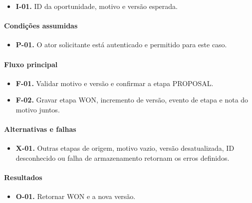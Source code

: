 \documentclass[10pt,a4paper]{article}
\begin{document}
\begin{itemize}

\item \textbf{I-01.} ID da oportunidade, motivo e versão esperada.

\end{itemize}

\paragraph{Condições assumidas}

\begin{itemize}

\item \textbf{P-01.} O ator solicitante está autenticado e permitido para este caso.

\end{itemize}

\paragraph{Fluxo principal}

\begin{itemize}

\item \textbf{F-01.} Validar motivo e versão e confirmar a etapa PROPOSAL.

\item \textbf{F-02.} Gravar etapa WON, incremento de versão, evento de etapa e nota do motivo juntos.

\end{itemize}

\paragraph{Alternativas e falhas}

\begin{itemize}

\item \textbf{X-01.} Outras etapas de origem, motivo vazio, versão desatualizada, ID desconhecido ou falha de armazenamento retornam os erros definidos.

\end{itemize}

\paragraph{Resultados}

\begin{itemize}

\item \textbf{O-01.} Retornar WON e a nova versão.

\end{itemize}
\end{document}
